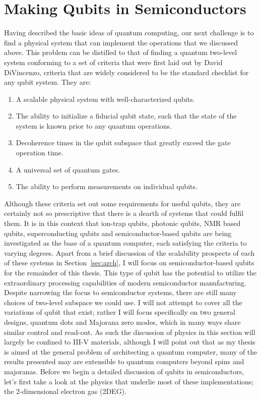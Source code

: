 \section{Making Qubits in Semiconductors}
\label{sec:qcinsm}
Having described the basic ideas of quantum computing, our next challenge is to find a physical system that
can implement the operations that we discussed above. This problem can be distilled to that
of finding a quantum two-level system conforming to a set of criteria that were first laid out by David
DiVincenzo, criteria that are widely considered to be the standard checklist for any qubit system\cite{divincenzo_crit}. They are:
\begin{enumerate}
  \item A scalable physical system with well-characterized qubits.
  \item The ability to initialize a fiducial qubit state, such that the state of the system is known prior
    to any quantum operations.
  \item Decoherence times in the qubit subspace that greatly exceed the gate operation time.
  \item A universal set of quantum gates.
  \item The ability to perform measurements on individual qubits.
\end{enumerate}
Although these criteria set out some requirements for useful qubits, they are certainly not so prescriptive
that there is a dearth of systems that could fulfil them. It is in this context that ion-trap qubits, photonic qubits,
NMR based qubits, superconducting qubits and semiconductor-based qubits are being investigated as the base of a quantum computer, each satisfying the
criteria to varying degrees. Apart from a brief discussion of the scalability prospects of each of these systems
in Section~\ref{sec:arch}, I will focus on semiconductor-based qubits for the remainder of this thesis. This type
of qubit has the potential to utilize the extraordinary processing capabilities of modern semiconductor manufacturing.
Despite narrowing the focus to semiconductor systems, there are still many
choices of two-level subspace we could use. I will not attempt to cover all the variations
of qubit that exist; rather I will focus specifically on two general designs, quantum dots and Majorana zero modes,
which in many ways share similar control and read-out. As such the discussion of physics in this section will
largely be confined to III-V materials, although I will point out that as my thesis is aimed at the general
problem of architecting a quantum computer, many of the results presented may are extensible to quantum
computers beyond spins and majoranas. Before we begin a detailed discussion of qubits in semiconductors, let's first take a look
at the physics that underlie most of these implementations; the 2-dimensional electron gas (2DEG).

